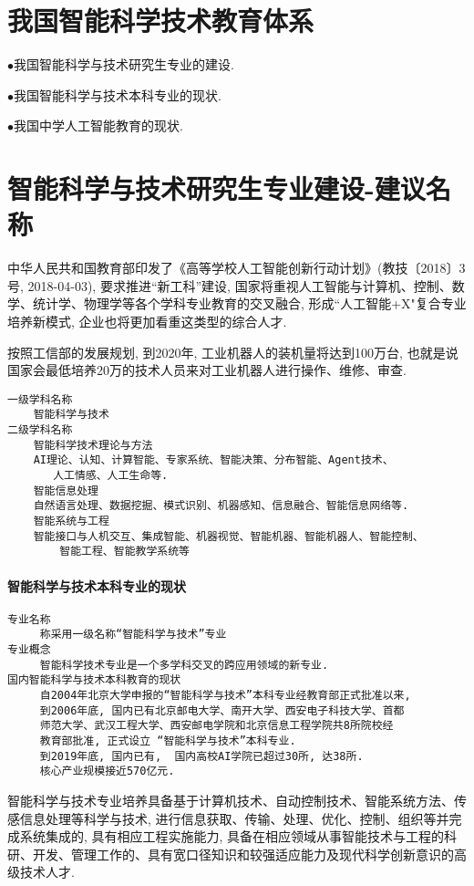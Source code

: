 \section{我国智能科学技术教育体系}
$\bullet$我国智能科学与技术研究生专业的建设.

$\bullet$我国智能科学与技术本科专业的现状.

$\bullet$我国中学人工智能教育的现状.
\section{智能科学与技术研究生专业建设-建议名称}
中华人民共和国教育部印发了《高等学校人工智能创新行动计划》(教技〔2018〕3号,  2018-04-03), 要求推进“新工科”建设,
国家将重视人工智能与计算机、控制、数学、统计学、物理学等各个学科专业教育的交叉融合, 形成``人工智能+X"复合专业培养新模式, 企业也将更加看重这类型的综合人才.

按照工信部的发展规划, 到2020年, 工业机器人的装机量将达到100万台, 也就是说国家会最低培养20万的技术人员来对工业机器人进行操作、维修、审查.
\begin{Verbatim}
一级学科名称
    智能科学与技术
二级学科名称
    智能科学技术理论与方法
    AI理论、认知、计算智能、专家系统、智能决策、分布智能、Agent技术、
       人工情感、人工生命等.
    智能信息处理
    自然语言处理、数据挖掘、模式识别、机器感知、信息融合、智能信息网络等.
    智能系统与工程
    智能接口与人机交互、集成智能、机器视觉、智能机器、智能机器人、智能控制、
        智能工程、智能教学系统等
\end{Verbatim}
\paragraph{智能科学与技术本科专业的现状}
\begin{Verbatim}
专业名称
     称采用一级名称“智能科学与技术”专业
专业概念
     智能科学技术专业是一个多学科交叉的跨应用领域的新专业.
国内智能科学与技术本科教育的现状
     自2004年北京大学申报的“智能科学与技术”本科专业经教育部正式批准以来,
     到2006年底, 国内已有北京邮电大学、南开大学、西安电子科技大学、首都
     师范大学、武汉工程大学、西安邮电学院和北京信息工程学院共8所院校经
     教育部批准, 正式设立 “智能科学与技术”本科专业.
     到2019年底, 国内已有,  国内高校AI学院已超过30所, 达38所.
     核心产业规模接近570亿元.
\end{Verbatim}

智能科学与技术专业培养具备基于计算机技术、自动控制技术、智能系统方法、传感信息处理等科学与技术, 进行信息获取、传输、处理、优化、控制、组织等并完成系统集成的, 具有相应工程实施能力,
具备在相应领域从事智能技术与工程的科研、开发、管理工作的、具有宽口径知识和较强适应能力及现代科学创新意识的高级技术人才.
